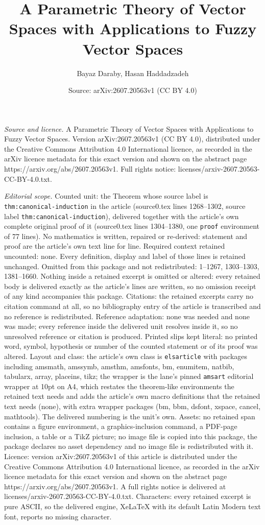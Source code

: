 \documentclass[10pt,a4paper]{amsart}
\title[A Parametric Theory of Vector Spaces with Applications to Fu]{A Parametric Theory of Vector Spaces with Applications to Fuzzy Vector Spaces}
\author{Bayaz Daraby, Hasan Haddadzadeh}
\date{Source: arXiv:2607.20563v1 (CC BY 4.0)}
\begin{document}
\maketitle

\noindent\emph{Source and licence.} A Parametric Theory of Vector Spaces with Applications to Fuzzy Vector Spaces. Version arXiv:2607.20563v1 (CC BY 4.0), distributed under the Creative Commons Attribution 4.0 International licence, as recorded in the arXiv licence metadata for this exact version and shown on the abstract page https://arxiv.org/abs/2607.20563v1. Full rights notice: licenses/arxiv-2607.20563-CC-BY-4.0.txt.\par\smallskip

\noindent\textit{Editorial scope.} Counted unit: the Theorem whose source label is \texttt{thm:canonical-induction} in the article (source0.tex lines 1268--1302, source label \texttt{thm:canonical-induction}), delivered together with the article's own complete original proof of it (source0.tex lines 1304--1380, one \texttt{proof} environment of 77 lines). No mathematics is written, repaired or re-derived: statement and proof are the article's own text line for line. Required context retained uncounted: none. Every definition, display and label of those lines is retained unchanged. Omitted from this package and not redistributed: 1--1267, 1303--1303, 1381--1660. Nothing inside a retained excerpt is omitted or altered: every retained body is delivered exactly as the article's lines are written, so no omission receipt of any kind accompanies this package. Citations: the retained excerpts carry no citation command at all, so no bibliography entry of the article is transcribed and no reference is redistributed. Reference adaptation: none was needed and none was made; every reference inside the delivered unit resolves inside it, so no unresolved reference or citation is produced. Printed slips kept literal: no printed word, symbol, hypothesis or number of the counted statement or of its proof was altered. Layout and class: the article's own class is \texttt{elsarticle} with packages including amsmath, amssymb, amsthm, amsfonts, bm, enumitem, natbib, tabularx, array, placeins, tikz; the wrapper is the lane's pinned \texttt{amsart} editorial wrapper at 10pt on A4, which restates the theorem-like environments the retained text needs and adds the article's own macro definitions that the retained text needs (none), with extra wrapper packages (bm, bbm, dsfont, xspace, cancel, mathtools). The delivered numbering is the unit's own. Assets: no retained span contains a figure environment, a graphics-inclusion command, a PDF-page inclusion, a table or a TikZ picture; no image file is copied into this package, the package declares no asset dependency and no image file is redistributed with it. Licence: version arXiv:2607.20563v1 of this article is distributed under the Creative Commons Attribution 4.0 International licence, as recorded in the arXiv licence metadata for this exact version and shown on the abstract page https://arxiv.org/abs/2607.20563v1. A full rights notice is delivered at licenses/arxiv-2607.20563-CC-BY-4.0.txt. Characters: every retained excerpt is pure ASCII, so the delivered engine, XeLaTeX with its default Latin Modern text font, reports no missing character.
\end{document}
